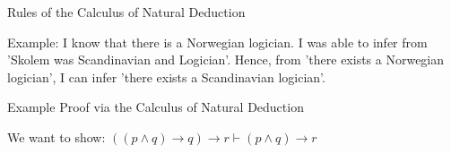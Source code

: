\documentclass{beamer}
\begin{document}
  \begin{frame}{Rules of the Calculus of Natural Deduction}


      \begin{prooftree}
    \end{prooftree}

    \begin{prooftree}
    \end{prooftree}


    \vspace{0.5cm}
    Example: I know that there is a Norwegian logician. I was able to infer from 'Skolem was Scandinavian and Logician'. Hence, from 'there exists a Norwegian logician', I can infer 'there exists a Scandinavian logician'.

  \end{frame}

\begin{frame}{Example Proof via the Calculus of Natural Deduction}

  
  We want to show: $((p\wedge q)\rightarrow q)\rightarrow r\vdash (p\wedge q)\rightarrow r$

  \begin{prooftree}
    
    
  \end{prooftree}
\end{frame}





  
  
\end{document}
